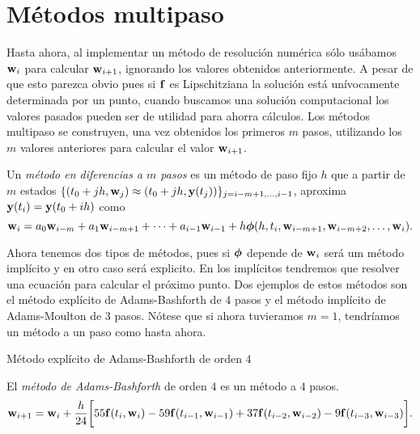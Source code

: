 \section{Métodos multipaso}

Hasta ahora, al implementar un método de resolución numérica sólo usábamos
$\vb{w}{}_i$ para calcular $\vb{w}{}_{i+1}$,
ignorando los valores obtenidos anteriormente.
A pesar de que esto parezca obvio pues si $\vb{f}{}$ es Lipschitziana
la solución está unívocamente determinada por un punto,
cuando buscamos una solución computacional
los valores pasados pueden ser de utilidad para ahorra cálculos.
Los métodos multipaso se construyen, una vez obtenidos los primeros $m$ pasos,
utilizando los $m$ valores anteriores para calcular el valor $\vb{w}{}_{i+1}$.

\begin{definition}
    Un \emph{método en diferencias a $m$ pasos} es un método de paso fijo $h$
    que a partir de $m$ estados
    $\{(t_0 + jh, \vb{w}{}_j) \approx (t_0 + jh, \vb{y}{}(t_j))\}_{j = i-m+1,\ldots,i-1}$,
    aproxima $\vb{y}{}(t_i) = \vb{y}{}(t_0 + ih)$ como
    \begin{equation*}
        \vb{w}{}_i = a_0\vb{w}{}_{i-m} + a_1\vb{w}{}_{i-m+1} + \dots + a_{i-1}\vb{w}{}_{i-1}
            + h\vb*{\phi}{}(h, t_i, \vb{w}{}_{i-m+1}, \vb{w}{}_{i-m+2}, \dots, \vb{w}{}_i).
    \end{equation*}
\end{definition}

Ahora tenemos dos tipos de métodos, pues si $\vb*{\phi}{}$ depende de $\vb{w}{}_i$
será um método implícito y en otro caso será explicito.
En los implícitos tendremos que resolver una ecuación
para calcular el próximo punto.
Dos ejemplos de estos métodos son
el método explícito de Adams-Bashforth de $4$ pasos y
el método implícito de Adams-Moulton de $3$ pasos.
Nótese que si ahora tuvieramos $m = 1$,
tendríamos un método a un paso como hasta ahora.

\begin{method}{Método explícito de Adams-Bashforth de orden $4$}
    \label{met:AB4steps}

    El \emph{método de Adams-Bashforth} de orden $4$
    es un método a $4$ pasos.
    \begin{equation}
        \vb{w}{}_{i+1} = \vb{w}{}_i + \frac{h}{24}\qty\bigg[
            55\vb{f}{}(t_i, \vb{w}{}_i) - 59\vb{f}{}(t_{i-1}, \vb{w}{}_{i-1})
            + 37\vb{f}{}(t_{i-2}, \vb{w}{}_{i-2}) - 9\vb{f}{}(t_{i-3}, \vb{w}{}_{i-3})
        ].
    \end{equation}
\end{method}

